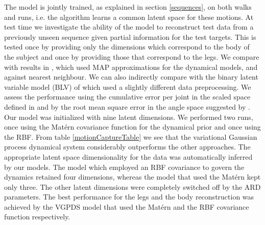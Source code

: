 \documentclass{article} %
\begin{document}
The model is jointly trained, as explained in section \ref{sequences},
on both walks and runs, i.e. the algorithm learns a common latent
space for these motions. At test time we investigate the ability of
the model to reconstruct test data from a previously unseen sequence
given partial information for the test targets. This is tested once by
providing only the dimensions which correspond to the body of the
subject and once by providing those that correspond to the legs.
%
We compare with results in \cite{gplvmLarger}, which used MAP
approximations for the dynamical models, and against nearest
neighbour. We can also indirectly compare with the binary latent
variable model (BLV) of \cite{Taylor} which used a slightly different
data preprocessing. We assess the performance using the cumulative
error per joint in the scaled space defined in \cite{Taylor} and by
the root mean square error in the angle space suggested by
\cite{gplvmLarger}. Our model was initialized with nine latent
dimensions. We performed two runs, once using the Mat\'ern covariance
function for the dynamical prior and once using the RBF. From table
\ref{motionCaptureTable} we see that the variational Gaussian process
dynamical system considerably outperforms the other approaches.
%
The appropriate latent space dimensionality for the data was
automatically inferred by our models. 
The model which employed an RBF covariance to govern the dynamics retained four dimensions,
whereas the model that used the Mat\'ern kept only three.
%
%
The other latent dimensions were completely switched off by the ARD
parameters.  The best performance for the legs and the body
reconstruction was achieved by the VGPDS model that used the Mat\'ern
and the RBF covariance function respectively.
\end{document}
